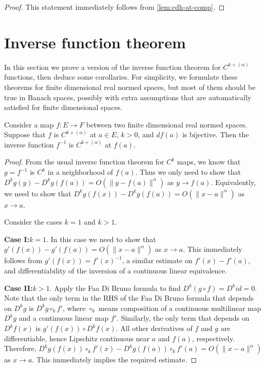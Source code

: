 \begin{proof}
  This statement immediately follows from \autoref{lem:cdh-at-comp}.
\end{proof}

\section{Inverse function theorem}%
\label{sec:inverse-funct-theor}

In this section we prove a version of the inverse function theorem for \(C^{k+(\alpha)}\) functions,
then deduce some corollaries.
For simplicity, we formulate these theorems for finite dimensional real normed spaces,
but most of them should be true in Banach spaces,
possibly with extra assumptions that are automatically satisfied for finite dimensional spaces.

\begin{theorem}%
  \label{thm:cdh-at-inverse}
  Consider a map \(f\colon E\to F\) between two finite dimensional real normed spaces.
  Suppose that \(f\) is \(C^{k+(\alpha)}\) at \(a \in E\), \(k > 0\), and \(df(a)\) is bijective.
  Then the inverse function \(f^{-1}\) is \(C^{k+(\alpha)}\) at \(f(a)\).
\end{theorem}
\begin{proof}
  From the usual inverse function theorem for \(C^{k}\) maps,
  we know that \(g=f^{-1}\) is \(C^{k}\) in a neighborhood of \(f(a)\).
  Thus we only need to show that \(D^{k}g(y)-D^{k}g(f(a)) = O\left(\|y - f(a)\|^{\alpha}\right)\) as \(y \to f(a)\).
  Equivalently, we need to show that \(D^{k}g(f(x)) - D^{k}g(f(a)) = O\left(\|x - a\|^{\alpha}\right)\) as \(x\to a\).

  Consider the cases \(k = 1\) and \(k > 1\).

  \textbf{Case I:\@\(k = 1\)}. In this case we need to show that
  \(g'(f(x)) - g'(f(a)) = O\left(\|x - a\|^{\alpha}\right)\) as \(x\to a\).
  This immediately follows from \(g'(f(x)) = {f'(x)}^{-1}\),
  a similar estimate on \(f'(x) - f'(a)\),
  and differentiability of the inversion of a continuous linear equivalence.

  \textbf{Case II:\@\(k > 1\)}.
  Apply the Faa Di Bruno formula to find \(D^{k}(g \circ f) = D^{k} id =0\).
  Note that the only term in the RHS of the Faa Di Bruno formula
  that depends on \(D^{k}g\) is \(D^{k}g\circ_{k} f'\),
  where \(\circ_{k}\) means composition of a continuous multilinear map \(D^{k}g\)
  and a continuous linear map \(f'\).
  Similarly, the only term that depends on \(D^{k}f(x)\) is \(g'(f(x))\circ D^{k}f(x)\).
  All other derivatives of \(f\) and \(g\) are differentiable,
  hence Lipschitz continuous near \(a\) and \(f(a)\), respectively.
  Therefore, \(D^{k}g(f(x))\circ_{k}f'(x) - D^{k}g(f(a))\circ_{k}f'(a)=O\left(\|x - a\|^{\alpha}\right)\) as \(x\to a\).
  This immediately implies the required estimate.
\end{proof}

